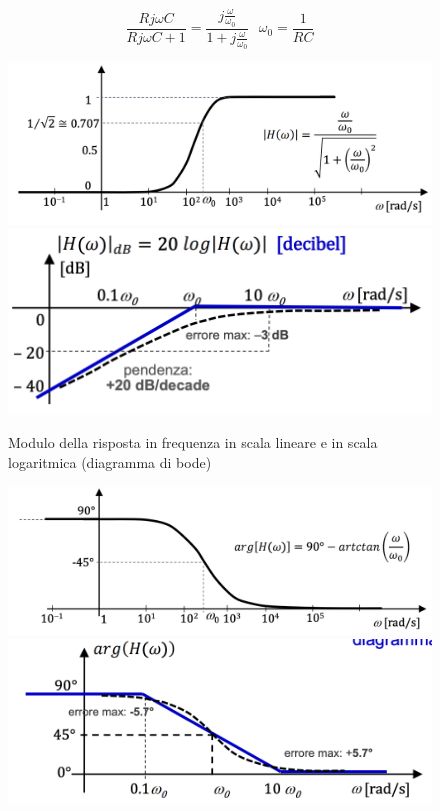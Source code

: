 \documentclass{article}
\theoremstyle{definition}
\begin{document}
\begin{itemize}
$$\frac{Rj\omega C}{Rj\omega C+1}=\frac{j\frac{\omega}{\omega_0}}{1+j\frac{\omega}{\omega_0}}\ \ \ \omega_0=\frac{1}{RC}$$
\begin{figure}[h]
	\centering 
	\includegraphics[scale=0.25]{immagini/pag}
	\hfil 
	\includegraphics[scale=0.35]{immagini/pabode}
	\caption{Modulo della risposta in frequenza in scala lineare e in scala logaritmica (diagramma di bode)}
\end{figure}
\begin{figure}[h]
	\centering 
	\includegraphics[scale=0.25]{immagini/pa1}
	\hfil 
	\includegraphics[scale=0.35]{immagini/pabode1}

\end{figure}
\end{itemize}
\end{document}
